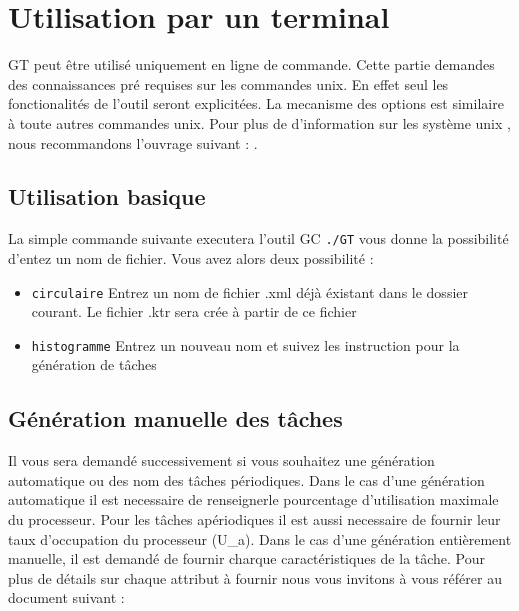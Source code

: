 \section{Utilisation par un terminal}
\label{chap:useterm}

\renewcommand{\labelitemi}{$\bullet$} %

GT peut être utilisé uniquement en ligne de commande. Cette partie demandes des connaissances pré requises sur les commandes unix. En effet seul les fonctionalités de l'outil seront explicitées. La mecanisme des options est similaire à toute autres commandes unix. Pour plus de d'information sur les système \gls{unix}
, nous recommandons l'ouvrage suivant : \cite{linux}.


\subsection{Utilisation basique}
\label{sec:usebas}
La simple commande suivante executera l'outil GC \verb+./GT+  vous donne la possibilité d'entez un nom de fichier. Vous avez alors deux possibilité : 
\begin{itemize}
\item
\verb+circulaire+ Entrez un nom de fichier .xml  déjà éxistant dans le dossier courant. Le fichier .ktr sera crée à partir de ce fichier
\item
\verb+histogramme+ Entrez un nouveau nom et suivez les instruction pour la génération de tâches
\end{itemize}


\subsection{Génération manuelle des tâches}
Il vous sera demandé successivement si vous souhaitez une génération automatique ou des nom des tâches périodiques. Dans le cas d'une génération automatique il est necessaire de renseignerle pourcentage d'utilisation maximale du processeur. Pour les tâches apériodiques il est aussi necessaire de fournir leur taux d'occupation du processeur (U\_a).
Dans le cas d'une génération entièrement manuelle, il est demandé de fournir charque caractéristiques de la tâche. Pour plus de détails sur chaque attribut à fournir nous vous invitons à vous référer au document suivant : \cite{SD}
 

